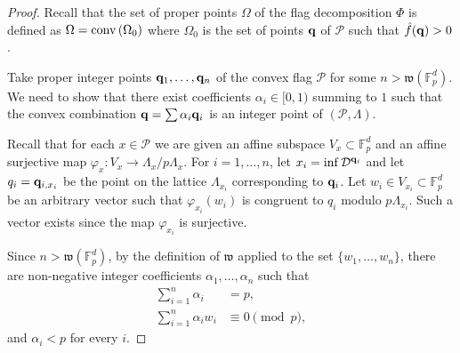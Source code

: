 \documentclass{daj}
\newcommand{\w}{\mathfrak w}
\newcommand{\FF}{\mathbb F}
\newcommand{\conv}{{\rm conv}\,}
\newcommand{\D}{\mathcal D}
\renewcommand{\P}{\mathcal P}
\theoremstyle{definition}
\theoremstyle{remark}
\theoremstyle{definition}
\theoremstyle{definition}
\begin{document}
\begin{proof}
Recall that the set of proper points $\Omega$ of the flag decomposition $\Phi$ is defined as $\Omega = \conv(\Omega_0)$ where $\Omega_0$ is the set of points ${\bf q}$ of $\P$ such that $\hat f({\bf q}) > 0$. 

Take proper integer points ${\bf q}_1, \ldots, {\bf q}_n$ of the convex flag $\P$ for some $n > \w(\FF_p^d)$. We need to show that there exist coefficients $\alpha_i \in [0, 1)$  summing to $1$ such that the convex combination ${\bf q} = \sum \alpha_i {\bf q}_i$ is an integer point of $(\P, \Lambda)$.

Recall that for each $x \in \P$ we are given an affine subspace $V_x \subset \FF_p^d$ and an affine surjective map $\varphi_x: V_x \rightarrow \Lambda_x / p\Lambda_x$.
For $i=1, \ldots, n$, let $x_i = \inf \D^{{\bf q}_i}$ and let $q_i = {\bf q}_{i, x_i}$ be the point on the lattice $\Lambda_{x_i}$ corresponding to ${\bf q}_i$. Let $w_i \in V_{x_i} \subset \FF_p^d$ be an arbitrary vector such that $\varphi_{x_i}(w_i)$ is congruent to $q_i$ modulo $p \Lambda_{x_i}$. Such a vector exists since the map $\varphi_{x_i}$ is surjective. 

Since $n > \w(\FF_p^d)$, by the definition of $\w$ applied to the set $\{w_1, \ldots, w_n\}$, there are non-negative integer coefficients $\alpha_1, \ldots, \alpha_n$ such that 
\begin{align}
    \sum_{i = 1}^n \alpha_i & = p, \label{comb0} \\
    \sum_{i = 1}^n \alpha_i w_i &\equiv 0 \pmod{p}, \label{comb}
\end{align}
and $\alpha_i < p$ for every $i$.


\end{proof}
\end{document}
